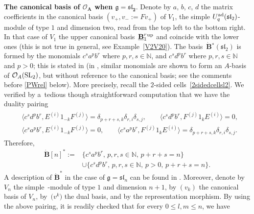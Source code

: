 \documentclass[pdftex]{sigma}
\numberwithin{equation}{section}
\theoremstyle{definition}
\newcommand{\mn}{\mathbb{N}}
\newcommand{\Oo}{{\mathcal O}}
\begin{document}
{\bf The canonical basis of $\boldsymbol{\Oo_A}$ when $\boldsymbol{\mathfrak{g}={\mathfrak{sl}_2}}$}. Denote by $a$, $b$, $c$, $d$ the matrix coefficients in the canonical basis $(v_+,v_-:=Fv_+)$ of $V_1$, the simple $U_q^{\rm ad}({\mathfrak{sl}_2})$-module of type $1$ and dimension two, read from the top left to the bottom right. In that case of $V_1$ the upper canonical basis~$\underline{\mathbf{B}}_{1}^r{}^{\rm up}$ and  coincide with the lower ones (this is not true in general, see Example~\ref{V2V20}). The basis~$\dot{\mathbf{B}} {}^*({\mathfrak{sl}_2})$ is formed by the monomials $c^sa^pb^r$ where $p,r,s\in \mn$, and $c^sd^pb^r$ where $p,r,s\in \mn$ and $p>0$; this is stated in \cite[Proposition~9.1.1]{Kashiwara2} (in \cite[Proposition~1.3]{DC-L}, similar monomials are shown to form an $A$-basis of $\Oo_A({\rm SL}_2)$, but without reference to the canonical basis; see the comments before \eqref{PWrel} below). More precisely, recall the $2$-sided cells~\eqref{2sidedcellsl2}. We verified by a~tedious though straightforward computation that we have the duality pairing
\begin{gather*}
\begin{split}
& \big\langle c^sd^pb^r, E^{(i)}1_{-k}F^{(j)} \big\rangle = \delta_{p+r+s,k}\delta_{r,i}\delta_{s,j} ,\qquad \big\langle c^sd^pb^r, F^{(j)}1_{k}E^{(i)} \big\rangle =0, \\
& \big\langle c^sa^pb^r, E^{(i)}1_{-k}F^{(j)} \big\rangle = 0 ,\qquad \big\langle c^sa^pb^r, F^{(j)}1_{k}E^{(i)} \big\rangle =\delta_{p+r+s,k}\delta_{r,i}\delta_{s,j}.
\end{split}
\end{gather*}
Therefore, \begin{align*}\dot{\mathbf{B}} [n]^* :={}& \{ c^sa^pb^r, \, p,r,s\in \mn,\, p+r+s=n\} \\&\cup \{ c^{s}d^{p}b^{r},\, p,r,s\in \mn,\, p>0,\, p+r+s=n\}.\end{align*}
A description of $\dot{\mathbf{B}}^*$ in the case of $\mathfrak{g} = {\mathfrak{sl}_n}$ can be found in \cite{Du}. Moreover, denote by $V_n$ the simple~-module of type $1$ and dimension $n+1$, by $(v_k)$ the canonical basis of $V_n$, by~$\big(v^k\big)$ the dual basis, and by  the representation morphism. By using the above pairing, it is readily checked that for every $0\leq l,m\leq n$, we have
\end{document}
